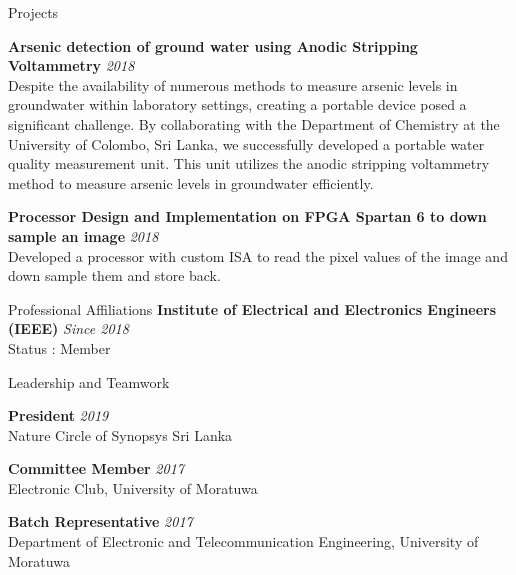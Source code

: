 \documentclass[
11pt, %
]{./assets/resume} %
\begin{document}
\begin{rSection}{Projects}

	\textbf{Arsenic detection of ground water using Anodic Stripping Voltammetry} \hfill \textit{2018}\\
	Despite the availability of numerous methods to measure arsenic levels in groundwater within laboratory settings, creating a portable device posed a significant challenge. By collaborating with the Department of Chemistry at the University of Colombo, Sri Lanka, we successfully developed a portable water quality measurement unit. This unit utilizes the anodic stripping voltammetry method to measure arsenic levels in groundwater efficiently. 

	\textbf{Processor Design and Implementation on FPGA Spartan 6 to down sample an image} \hfill \textit{2018}\\
	Developed a processor with custom ISA to read the pixel values of the image and down sample them and store back.  

\end{rSection}

\begin{rSection}{Professional Affiliations}
	\textbf{Institute of Electrical and Electronics Engineers (IEEE)} \hfill \textit{Since 2018}\\
	Status : Member
	
\end{rSection}


\begin{rSection}{Leadership and Teamwork}

\textbf{President} \hfill \textit{2019} \\
Nature Circle of Synopsys Sri Lanka


\textbf{Committee Member} \hfill \textit{2017} \\
Electronic Club, University of Moratuwa

\textbf{Batch Representative} \hfill \textit{2017} \\
Department of Electronic and Telecommunication Engineering, University of Moratuwa

\end{rSection}
\end{document}
